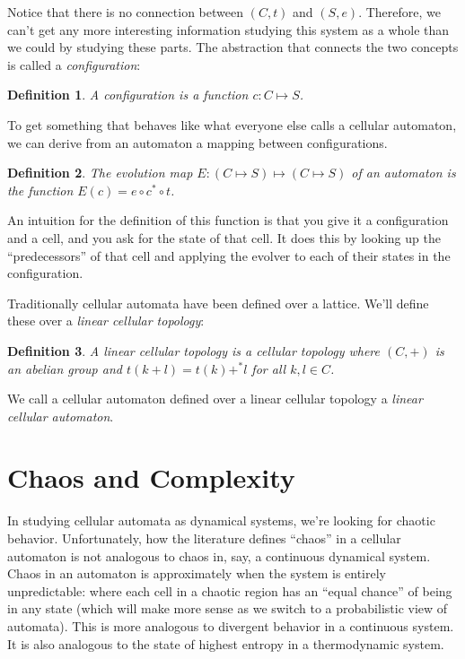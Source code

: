 \documentclass[12pt]{article}
\newtheorem*{Definition}{Definition}
\begin{document}
Notice that there is no connection between $(C,t)$ and $(S,e)$.
Therefore, we can't get any more interesting information studying this
system as a whole than we could by studying these parts.  The
abstraction that connects the two concepts is called a
\textit{configuration}:

\begin{Definition}
A configuration is a function $c: C \mapsto S$.
\end{Definition}

To get something that behaves like what everyone else calls a cellular
automaton, we can derive from an automaton a mapping between
configurations.

\begin{Definition}
The evolution map $E: (C \mapsto S) \mapsto (C \mapsto S)$ of an
automaton is the function $E(c) = e \circ c^* \circ t$.
\end{Definition}

An intuition for the definition of this function is that you give it a
configuration and a cell, and you ask for the state of that cell.  It
does this by looking up the ``predecessors'' of that cell and applying
the evolver to each of their states in the configuration.

Traditionally cellular automata have been defined over a lattice.  We'll
define these over a \textit{linear cellular topology}:

\begin{Definition}
A linear cellular topology is a cellular topology where $(C,+)$ is an
abelian group and $t(k+l) = t(k) +^* l$ for all $k,l \in C$.
\end{Definition}

We call a cellular automaton defined over a linear cellular topology
a \textit{linear cellular automaton}.

\section{Chaos and Complexity}

In studying cellular automata as dynamical systems, we're looking for
chaotic behavior.  Unfortunately, how the literature defines ``chaos''
in a cellular automaton is not analogous to chaos in, say, a continuous
dynamical system.  Chaos in an automaton is approximately when the
system is entirely unpredictable: where each cell in a chaotic region
has an ``equal chance'' of being in any state (which will make more
sense as we switch to a probabilistic view of automata).  This is more
analogous to divergent behavior in a continuous system.  It is also
analogous to the state of highest entropy in a thermodynamic system.
\end{document}
